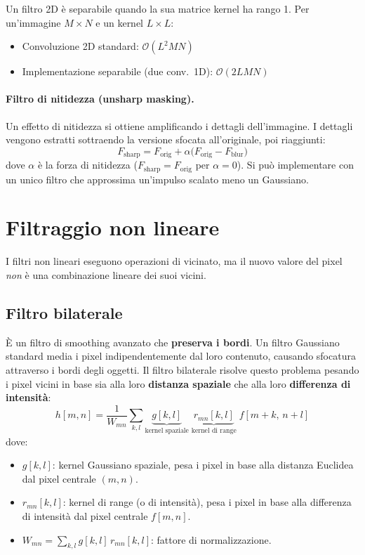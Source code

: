 \documentclass[12pt, a4paper]{report}
\begin{document}
\begin{notebox}
Un filtro 2D è separabile quando la sua matrice kernel ha rango 1.  Per
un'immagine $M\times N$ e un kernel $L\times L$:
\begin{itemize}
  \item Convoluzione 2D standard: $\mathcal{O}(L^2 MN)$
  \item Implementazione separabile (due conv.\ 1D): $\mathcal{O}(2LMN)$
\end{itemize}
\end{notebox}

\paragraph{Filtro di nitidezza (unsharp masking).}
Un effetto di nitidezza si ottiene amplificando i dettagli dell'immagine.  I
dettagli vengono estratti sottraendo la versione sfocata all'originale, poi
riaggiunti:
\[
  F_{\text{sharp}} = F_{\text{orig}} + \alpha\bigl(F_{\text{orig}} - F_{\text{blur}}\bigr)
\]
dove $\alpha$ è la forza di nitidezza ($F_{\text{sharp}} = F_{\text{orig}}$ per
$\alpha=0$).  Si può implementare con un unico filtro che approssima un'impulso
scalato meno un Gaussiano.

\section{Filtraggio non lineare}

I filtri non lineari eseguono operazioni di vicinato, ma il nuovo valore del pixel
\emph{non} è una combinazione lineare dei suoi vicini.

\subsection{Filtro bilaterale}

È un filtro di smoothing avanzato che \textbf{preserva i bordi}.  Un filtro
Gaussiano standard media i pixel indipendentemente dal loro contenuto, causando
sfocatura attraverso i bordi degli oggetti.  Il filtro bilaterale risolve questo
problema pesando i pixel vicini in base sia alla loro \textbf{distanza spaziale}
che alla loro \textbf{differenza di intensità}:
\[
  h[m,n] = \frac{1}{W_{mn}} \sum_{k,l}
    \underbrace{g[k,l]}_{\text{kernel spaziale}}\;
    \underbrace{r_{mn}[k,l]}_{\text{kernel di range}}\;
    f[m+k,\,n+l]
\]
dove:
\begin{itemize}
  \item $g[k,l]$: kernel Gaussiano spaziale, pesa i pixel in base alla distanza
        Euclidea dal pixel centrale $(m,n)$.
  \item $r_{mn}[k,l]$: kernel di range (o di intensità), pesa i pixel in base alla
        differenza di intensità dal pixel centrale $f[m,n]$.
  \item $W_{mn} = \sum_{k,l} g[k,l]\,r_{mn}[k,l]$: fattore di normalizzazione.
\end{itemize}
\end{document}
